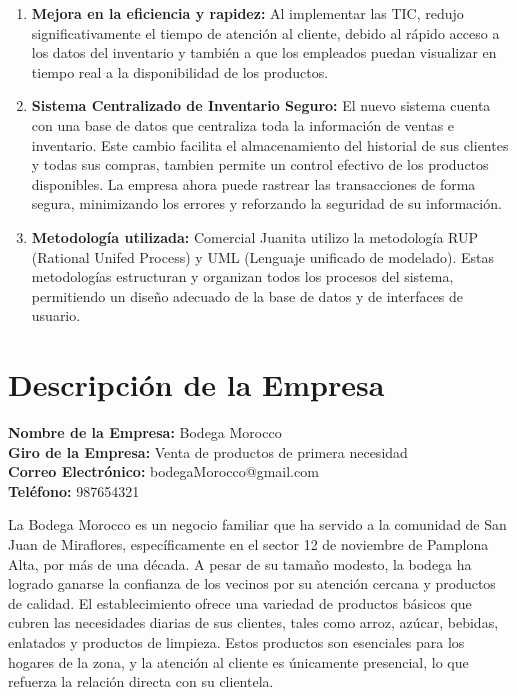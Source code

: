 \documentclass{article}
\begin{document}
\begin{itemize}
\begin{enumerate}
    \item \textbf{Mejora en la eficiencia y rapidez:} Al implementar las TIC, redujo significativamente el tiempo de atención al cliente, debido al rápido acceso a los datos del inventario y también a que los empleados puedan visualizar en tiempo real a la disponibilidad de los productos. 
    \item \textbf{Sistema Centralizado de Inventario Seguro:} El nuevo sistema cuenta con una base de datos que centraliza toda la información de ventas e inventario. Este cambio facilita el almacenamiento del historial de sus clientes y todas sus compras, tambien permite un control efectivo de los productos disponibles. La empresa ahora puede rastrear las transacciones de forma segura, minimizando los errores y reforzando la seguridad de su información.  
    \item \textbf{Metodología utilizada:} Comercial Juanita utilizo la metodología RUP (Rational Unifed Process) y UML (Lenguaje unificado de modelado). Estas metodologías estructuran y organizan todos los procesos del sistema, permitiendo un diseño adecuado de la base de datos y de interfaces de usuario. 
  \end{enumerate} 
\end{itemize}



\newpage

\section{Descripción de la Empresa}

  \begin{spacing}{1.5}
    \noindent
    \textbf{Nombre de la Empresa:} Bodega Morocco \\
    \textbf{Giro de la Empresa:} Venta de productos de primera necesidad \\
    \textbf{Correo Electrónico:} bodegaMorocco@gmail.com \\
    \textbf{Teléfono:} 987654321
  \end{spacing}

  La Bodega Morocco es un negocio familiar que ha servido a la comunidad de San Juan de Miraflores, específicamente en el sector 12 de noviembre de Pamplona Alta, por más de una década. A pesar de su tamaño modesto, la bodega ha logrado ganarse la confianza de los vecinos por su atención cercana y productos de calidad. El establecimiento ofrece una variedad de productos básicos que cubren las necesidades diarias de sus clientes, tales como arroz, azúcar, bebidas, enlatados y productos de limpieza. Estos productos son esenciales para los hogares de la zona, y la atención al cliente es únicamente presencial, lo que refuerza la relación directa con su clientela.
\end{document}
